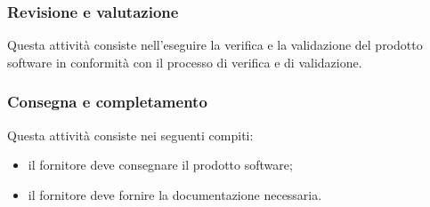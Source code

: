         \subsubsection{Revisione e valutazione}\label{sec:revisione e valutazione}
            Questa attività consiste nell'eseguire la verifica e la validazione del prodotto software in conformità con il processo di verifica e di validazione. 
        
        \subsubsection{Consegna e completamento}\label{sec:consegna e completamento}
            Questa attività consiste nei seguenti compiti:
            \begin{itemize}
                \item il fornitore deve consegnare il prodotto software;
                \item il fornitore deve fornire la documentazione necessaria.
            \end{itemize}



    
        
        